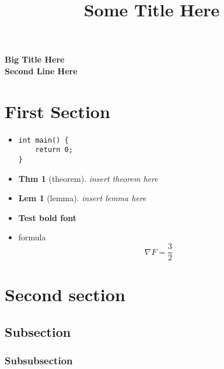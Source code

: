\documentclass[8pt]{extarticle}
\title{Some Title Here}
\date{}
\newtheorem{thm}{Thm}
\newtheorem{lem}{Lem}
\begin{document}
\begin{multicols*}{4}

{\Huge{\textbf{Big Title Here \\ Second Line Here}}}

\section{First Section}

\begin{itemize}[leftmargin=*]
\item 
\begin{lstlisting}
int main() {
    return 0;
}
\end{lstlisting}
\item \leavevmode \vspace{-1.7em}
\begin{thm}[theorem]
    insert theorem here
\end{thm}

\item  \leavevmode \vspace{-1.7em}         
\begin{lem}[lemma]
    insert lemma here
\end{lem}

\item \textbf{Test bold font}

\item formula
\[
    \nabla F = \frac{3}{2}
\]
\end{itemize}


\section{Second section}

\subsection*{Subsection}

\subsubsection*{Subsubsection}

\end{multicols*}
\end{document}
